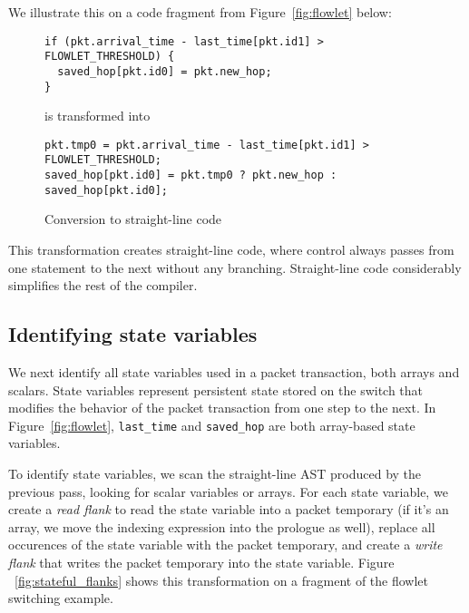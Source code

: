 We illustrate this on a code fragment from Figure~\ref{fig:flowlet} below:
\begin{figure}
\begin{tiny}
\begin{lstlisting}
if (pkt.arrival_time - last_time[pkt.id1] > FLOWLET_THRESHOLD) {
  saved_hop[pkt.id0] = pkt.new_hop;
}
\end{lstlisting}
\end{tiny}
\begin{center}
is transformed into
\end{center}
\begin{tiny}
\begin{lstlisting}
pkt.tmp0 = pkt.arrival_time - last_time[pkt.id1] > FLOWLET_THRESHOLD;
saved_hop[pkt.id0] = pkt.tmp0 ? pkt.new_hop : saved_hop[pkt.id0];
\end{lstlisting}
\end{tiny}
\caption{Conversion to straight-line code}
\label{fig:if_convert}
\end{figure}

This transformation creates straight-line code, where control always passes
from one statement to the next without any branching. Straight-line code
considerably simplifies the rest of the compiler.

\subsection{Identifying state variables}

We next identify all state variables used in a packet transaction, both arrays
and scalars. State variables represent persistent state stored on the switch
that modifies the behavior of the packet transaction from one step to the next.
In Figure~\ref{fig:flowlet}, \texttt{last\_time} and \texttt{saved\_hop} are
both array-based state variables.


To identify state variables, we scan the straight-line AST produced by the
previous pass, looking for scalar variables or arrays. For each state variable,
we create a \textit{read flank} to read the state variable into a packet
temporary (if it's an array, we move the indexing expression into the prologue
as well), replace all occurences of the state variable with the packet
temporary, and create a \textit{write flank} that writes the packet temporary into the
state variable.  Figure ~\ref{fig:stateful_flanks} shows this transformation on
a fragment of the flowlet switching example.

